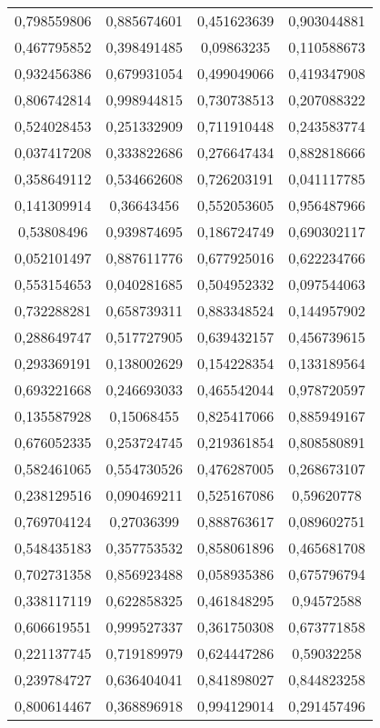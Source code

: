 \documentclass[a4paper,14pt]{extarticle}
\begin{document}
\begin{longtable}{|c|c|c|c|}
	0,798559806 & 0,885674601 & 0,451623639 & 0,903044881 \\
	0,467795852 & 0,398491485 & 0,09863235 & 0,110588673 \\
	0,932456386 & 0,679931054 & 0,499049066 & 0,419347908 \\
	0,806742814 & 0,998944815 & 0,730738513 & 0,207088322 \\
	0,524028453 & 0,251332909 & 0,711910448 & 0,243583774 \\
	0,037417208 & 0,333822686 & 0,276647434 & 0,882818666 \\
	0,358649112 & 0,534662608 & 0,726203191 & 0,041117785 \\
	0,141309914 & 0,36643456 & 0,552053605 & 0,956487966 \\
	0,53808496 & 0,939874695 & 0,186724749 & 0,690302117 \\
	0,052101497 & 0,887611776 & 0,677925016 & 0,622234766 \\
	0,553154653 & 0,040281685 & 0,504952332 & 0,097544063 \\
	0,732288281 & 0,658739311 & 0,883348524 & 0,144957902 \\
	0,288649747 & 0,517727905 & 0,639432157 & 0,456739615 \\
	0,293369191 & 0,138002629 & 0,154228354 & 0,133189564 \\
	0,693221668 & 0,246693033 & 0,465542044 & 0,978720597 \\
	0,135587928 & 0,15068455 & 0,825417066 & 0,885949167 \\
	0,676052335 & 0,253724745 & 0,219361854 & 0,808580891 \\
	0,582461065 & 0,554730526 & 0,476287005 & 0,268673107 \\
	0,238129516 & 0,090469211 & 0,525167086 & 0,59620778 \\
	0,769704124 & 0,27036399 & 0,888763617 & 0,089602751 \\
	0,548435183 & 0,357753532 & 0,858061896 & 0,465681708 \\
	0,702731358 & 0,856923488 & 0,058935386 & 0,675796794 \\
	0,338117119 & 0,622858325 & 0,461848295 & 0,94572588 \\
	0,606619551 & 0,999527337 & 0,361750308 & 0,673771858 \\
	0,221137745 & 0,719189979 & 0,624447286 & 0,59032258 \\
	0,239784727 & 0,636404041 & 0,841898027 & 0,844823258 \\
	0,800614467 & 0,368896918 & 0,994129014 & 0,291457496 \\

\end{longtable}
\end{document}
